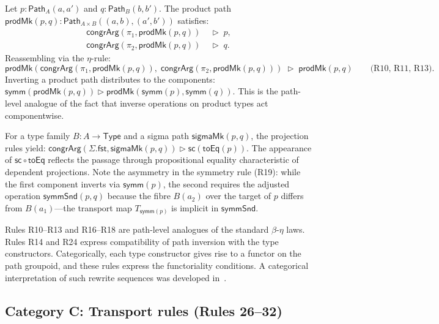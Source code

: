 \documentclass[manuscript]{BSLstyle}
\newcommand{\Path}{\mathsf{Path}}
\newcommand{\symm}{\mathsf{symm}}
\newcommand{\congrArg}{\mathsf{congrArg}}
\newcommand{\Type}{\mathsf{Type}}
\begin{document}
\begin{example}\label{ex:product-path-eta}
Let $p : \Path_A(a, a')$ and $q : \Path_B(b, b')$.  The product path
$\mathsf{prodMk}(p, q) : \Path_{A \times B}((a,b), (a',b'))$ satisfies:
\begin{align*}
\congrArg(\pi_1, \mathsf{prodMk}(p, q)) &\;\triangleright\; p, \\
\congrArg(\pi_2, \mathsf{prodMk}(p, q)) &\;\triangleright\; q.
\end{align*}
Reassembling via the $\eta$-rule:
\[
\mathsf{prodMk}(\congrArg(\pi_1, \mathsf{prodMk}(p,q)),\;
  \congrArg(\pi_2, \mathsf{prodMk}(p,q)))
  \;\triangleright\; \mathsf{prodMk}(p, q)
  \qquad \text{(R10, R11, R13).}
\]
Inverting a product path distributes to the components:
$\symm(\mathsf{prodMk}(p, q)) \triangleright \mathsf{prodMk}(\symm(p), \symm(q))$.
This is the path-level analogue of the fact that inverse operations on
product types act componentwise.
\end{example}

\begin{example}\label{ex:sigma-path}
For a type family $B : A \to \Type$ and a sigma path
$\mathsf{sigmaMk}(p, q)$, the projection rules yield:
$\congrArg(\Sigma.\mathsf{fst}, \mathsf{sigmaMk}(p, q)) \triangleright
\mathsf{sc}(\mathsf{toEq}(p))$.
The appearance of $\mathsf{sc} \circ \mathsf{toEq}$ reflects the passage
through propositional equality characteristic of dependent projections.
Note the asymmetry in the symmetry rule (R19): while the first component
inverts via $\symm(p)$, the second requires the adjusted operation
$\mathsf{symmSnd}(p, q)$ because the fibre $B(a_2)$ over the target
of $p$ differs from $B(a_1)$---the transport map $T_{\symm(p)}$ is
implicit in $\mathsf{symmSnd}$.
\end{example}

\begin{remark}
Rules R10--R13 and R16--R18 are path-level analogues of the standard
$\beta$-$\eta$ laws. Rules R14 and R24 express compatibility of path
inversion with the type constructors. Categorically, each type
constructor gives rise to a functor on the path groupoid, and these
rules express the functoriality conditions.  A categorical interpretation
of such rewrite sequences was developed in~\cite{RamosDeQueirozDeOliveira2014}.
\end{remark}

\subsection{Category C: Transport rules (Rules 26--32)}\label{ssec:cat-C}
\end{document}
